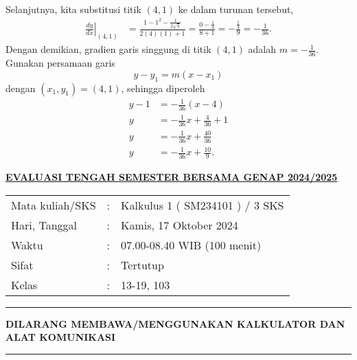 \documentclass[11pt,openany,a4paper]{article}
\renewcommand{\headrulewidth}{0pt}
\renewcommand{\footrulewidth}{0pt}
\begin{document}
\begin{enumerate}
\begin{align*}
          \end{align*}
          Selanjutnya, kita substitusi titik $(4,1)$ ke dalam turunan tersebut,
          \begin{align*}
              \left.\frac{dy}{dx}\right|_{(4,1)} & = \frac{1 - 1^2 - \frac{1}{2\sqrt{4}}}{2(4)(1) + 1} = \frac{0 - \frac{1}{4}}{8 + 1} = -\frac{\frac{1}{4}}{9} = -\frac{1}{36}.
          \end{align*}
          Dengan demikian, gradien garis singgung di titik $(4,1)$ adalah $m = -\frac{1}{36}$. Gunakan persamaan garis
          \[
              y - y_1 = m(x - x_1)
          \]
          dengan $(x_1,y_1) = (4,1)$, sehingga diperoleh
          \begin{align*}
              y - 1 & = -\frac{1}{36}(x - 4)              \\
              y     & = -\frac{1}{36}x + \frac{4}{36} + 1 \\
              y     & = -\frac{1}{36}x + \frac{40}{36}    \\
              y     & = -\frac{1}{36}x + \frac{10}{9}.
          \end{align*}
\end{enumerate}

\newpage
\renewcommand{\arraystretch}{1}
\fancyhead{}
\fancyfoot{}
\fancyhead[r]{}
\renewcommand{\headrulewidth}{0pt}
\renewcommand{\footrulewidth}{0pt}
\begin{center}
    {\underline{\textbf{\MakeUppercase{Evaluasi Tengah Semester Bersama Genap 2024/2025}}}}
\end{center}

\begin{center}
    \begin{tabular}{lcl}
        Mata kuliah/SKS & : & Kalkulus 1 ( SM234101 ) / 3 SKS \\
        Hari, Tanggal   & : & Kamis, 17 Oktober 2024          \\
        Waktu           & : & 07.00-08.40 WIB (100 menit)     \\
        Sifat           & : & Tertutup                        \\
        Kelas           & : & 13-19, 103
    \end{tabular}
\end{center}

\noindent\rule{\textwidth}{2.pt}

\setlength{\parindent}{5pt}
\setlength{\parindent}{5pt}
\setlength{\parindent}{5pt}
\par \textbf{\small\MakeUppercase{dilarang membawa/menggunakan kalkulator dan alat komunikasi}}
\par {}
\noindent\rule{\textwidth}{2.pt}
\end{document}
